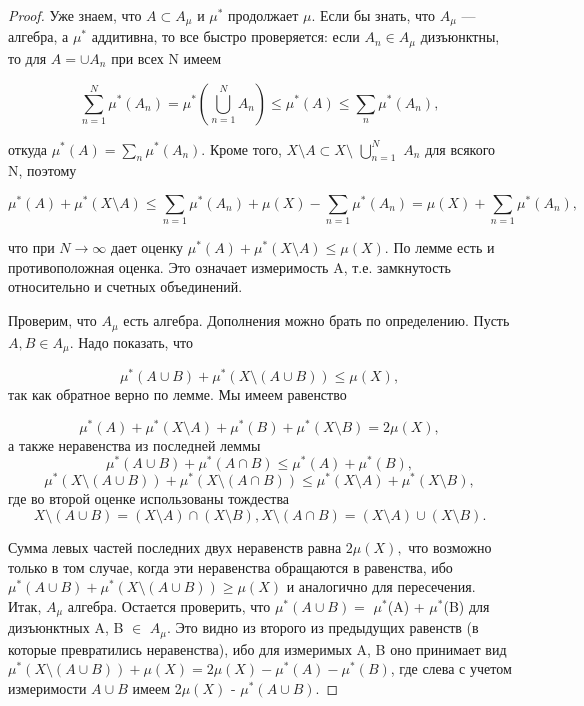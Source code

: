 \begin{proof} Уже знаем, что $A \subset A_\mu$ и $\mu^*$ продолжает $\mu$. Если бы знать, что $A_\mu$ — алгебра, а $\mu^*$ аддитивна, то все быстро проверяется: если $A_n \in A_\mu$ дизъюнктны, то для $A =\cup A_n $ при всех N имеем

$$\sum_{n= 1}^{N} \mu^*(A_n) = \mu^*(\bigcup_{n= 1}^{N} A_n) \leq \mu^*(A) \leq \sum_{n}\mu^*(A_n),$$

откуда $\mu^*(A) = \sum_{n} \mu^*(A_n).$ Кроме того, $X\setminus A \subset X \setminus$ $\bigcup_{n= 1}^{N}$  $A_n$ для всякого N, поэтому

$$\mu^*(A)+\mu^*(X\setminus A) \leq \sum_{n= 1} \mu^*(A_n)+\mu(X)- \sum_{n= 1}\mu^*(A_n) = \mu(X)+ \sum_{n= 1} \mu^*(A_n),$$

что при $N \rightarrow \infty$ дает оценку $\mu^*(A) + \mu^*(X\setminus A) \leq \mu(X).$ По лемме есть и противоположная оценка. Это означает измеримость A, т.е. замкнутость относительно и счетных объединений.

Проверим, что $A_\mu$ есть алгебра. Дополнения можно брать по определению. Пусть $A, B \in A_\mu$. Надо показать, что

$$\mu^*(A \cup B) + \mu^*(X\setminus(A \cup B)) \leq \mu(X),$$
так как обратное верно по лемме. Мы имеем равенство

$$\mu^*(A) + \mu^*(X\setminus A) + \mu^*(B) + \mu^*(X\setminus B) = 2\mu(X),$$
а также неравенства из последней леммы
$$\mu^*(A \cup B) + \mu^*(A \cap B) \leq \mu^*(A) + \mu^*(B),$$
$$\mu^*(X\setminus(A \cup B)) + \mu^*(X\setminus(A \cap B)) \leq \mu^*(X\setminus A) + \mu^*(X\setminus B),
$$
где во второй оценке использованы тождества
$$X\setminus(A \cup B) = (X\setminus A) \cap (X\setminus B), X\setminus(A \cap B) = (X\setminus A) \cup (X\setminus B).$$

Сумма левых частей последних двух неравенств равна $2\mu(X),$ что возможно только в том случае, когда эти неравенства обращаются в равенства, ибо $\mu^*(A\cup B) + \mu^*(X\setminus(A \cup B)) \geq \mu(X)$ и аналогично для пересечения. Итак, $A_\mu$ алгебра. Остается проверить, что $\mu^*$$(A \cup B) =$ $\mu^*$(A) + $\mu^*$(B) для дизъюнктных A, B $\in$ $A_\mu$. Это видно из второго из предыдущих равенств (в которые превратились неравенства), ибо для измеримых A, B оно принимает вид $\mu^*(X\setminus(A \cup B)) + \mu(X) = 2\mu(X) - \mu^*(A) - \mu^*(B)$, где слева с учетом измеримости $A \cup B$ имеем 2$\mu(X)$ - $\mu^*(A \cup B).$
\end{proof}

